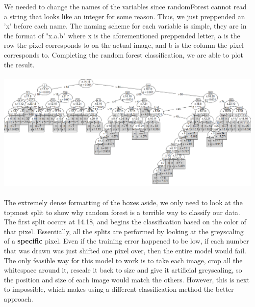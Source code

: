 \documentclass[10pt]{extarticle}
\begin{document}
We needed to change the names of the variables since randomForest cannot read a string that looks like an integer for some reason. Thus, we just preppended an 'x' before each name. The naming scheme for each variable is simple, they are in the format of "x.a.b" where x is the aforementioned preppended letter, a is the row the pixel corresponds to on the actual image, and b is the column the pixel corresponds to. Completing the random forest classification, we are able to plot the result.\\\\
\includegraphics[scale=0.45]{Rplotforest.png}\\\\
The extremely dense formatting of the boxes aside, we only need to look at the topmost split to show why random forest is a terrible way to classify our data. The first split occurs at 14.18, and begins the classification based on the color of that pixel. Essentially, all the splits are performed by looking at the greyscaling of a \textbf{specific} pixel. Even if the training error happened to be low, if each number that was drawn was just shifted one pixel over, then the entire model would fail. The only feasible way for this model to work is to take each image, crop all the whitespace around it, rescale it back to size and give it artificial greyscaling, so the position and size of each image would match the others. However, this is next to impossible, which makes using a different classification method the better approach.\\\\
\end{document}
